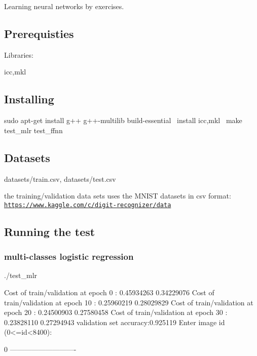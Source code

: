 Learning neural networks by exercises. \subsection*{Prerequisties}

Libraries\+:
\begin{DoxyItemize}
\item icc,mkl
\end{DoxyItemize}

\subsection*{Installing}

sudo apt-\/get install g++ g++-\/multilib build-\/essential~\newline
 install icc,mkl~\newline
 make test\+\_\+mlr test\+\_\+ffnn~\newline


\subsection*{Datasets}

datasets/train.\+csv, datasets/test.\+csv

the training/validation data sets uses the M\+N\+I\+ST datasets in csv format\+:~\newline
 \href{https://www.kaggle.com/c/digit-recognizer/data}{\tt https\+://www.\+kaggle.\+com/c/digit-\/recognizer/data}

\subsection*{Running the test}

\subsubsection*{multi-\/classes logistic regression}

./test\+\_\+mlr 
\begin{DoxyPre}{\ttfamily 
Cost of train/validation at epoch    0 :  0.45934263 0.34229076 
Cost of train/validation at epoch   10 :  0.25960219 0.28029829 
Cost of train/validation at epoch   20 :  0.24500903 0.27580458 
Cost of train/validation at epoch   30 :  0.23828110 0.27294943 
validation set accuracy:0.925119
Enter image id (0<=id<8400):~\newline

0
----------------------------}\end{DoxyPre}



